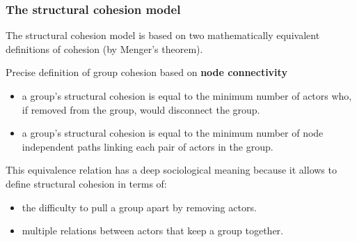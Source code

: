 \documentclass[ignorenonframetext,red,8pt,notes=hide]{beamer}
\begin{document}
\begin{frame}
\frametitle{The structural cohesion model}

The structural cohesion model \citep{white:2001,moody:2003} is based on two mathematically equivalent definitions of cohesion (by Menger's theorem).

\begin{block}{Precise definition of group cohesion based on \textbf{node connectivity}}

\begin{itemize}

\item a group's structural cohesion is equal to the minimum number of actors who, if removed from the group, would disconnect the group.

\item a group's structural cohesion is equal to the minimum number of node independent paths linking each pair of actors in the group.

\end{itemize}
\end{block}

This equivalence relation has a deep sociological meaning because it allows to define structural cohesion in terms of:

\begin{itemize}

\item the difficulty to pull a group apart by removing actors.

\item multiple relations between actors that keep a group together.

\end{itemize}
\end{frame}
\end{document}
